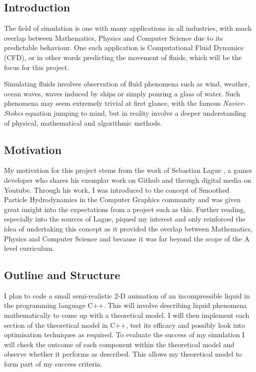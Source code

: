 \documentclass[a4paper,11pt]{article}
\begin{document}
\begin{multicols}{2}
\section{Introduction}
The field of simulation is one with many applications in all industries, with much overlap between Mathematics, Physics and Computer Science due to its predictable behaviour. One such application is Computational Fluid Dynamics (CFD), or in other words predicting the movement of fluids, which will be the focus for this project.

Simulating fluids involves observation of fluid phenomena such as wind, weather, ocean waves, waves induced by ships or simply pouring a glass of water. Such phenomena may seem extremely trivial at first glance, with the famous \textit{Navier-Stokes} equation jumping to mind, but in reality involve a deeper understanding of physical, mathematical and algorithmic methods.

\subsection{Motivation}

My motivation for this project stems from the work of Sebastian Lague \cite{Lague}, a games developer who shares his exemplar work on Github and through digital media on Youtube. Through his work, I was introduced to the concept of Smoothed Particle Hydrodynamics in the Computer Graphics community and was given great insight into the expectations from a project such as this. Further reading, especially into the sources of Lague, piqued my interest and only reinforced the idea of undertaking this concept as it provided the overlap between Mathematics, Physics and Computer Science and because it was far beyond the scope of the A level curriculum.

\subsection{Outline and Structure}
I plan to code a small semi-realistic 2-D animation of an incompressible liquid in the programming language C++. This will involve describing liquid phenomena mathematically to come up with a theoretical model. I will then implement each section of the theoretical model in C++, test its efficacy and possibly look into optimisation techniques as required. To evaluate the success of my simulation I will check the outcome of each component within the theoretical model and observe whether it performs as described. This allows my theoretical model to form part of my success criteria.


\end{multicols}
\end{document}
